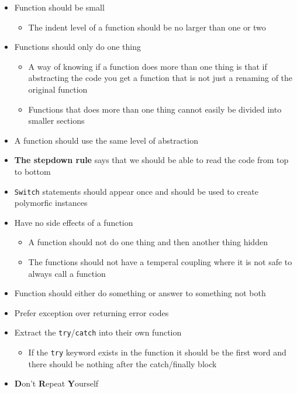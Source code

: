 \documentclass[11pt]{article}
\providecommand{\tightlist}{%
      \setlength{\itemsep}{0pt}\setlength{\parskip}{0pt}}
\begin{document}
\begin{itemize}
\tightlist
\item
  Function should be small

  \begin{itemize}
  \tightlist
  \item
    The indent level of a function should be no larger than one or two
  \end{itemize}
\item
  Functions should only do one thing

  \begin{itemize}
  \tightlist
  \item
    A way of knowing if a function does more than one thing is that if
    abstracting the code you get a function that is not just a renaming
    of the original function
  \item
    Functions that does more than one thing cannot easily be divided
    into smaller sections
  \end{itemize}
\item
  A function should use the same level of abstraction
\item
  \textbf{The stepdown rule} says that we should be able to read the
  code from top to bottom
\item
  \texttt{Switch} statements should appear once and should be used to
  create polymorfic instances
\item
  Have no side effects of a function

  \begin{itemize}
  \tightlist
  \item
    A function should not do one thing and then another thing hidden
  \item
    The functions should not have a temperal coupling where it is not
    safe to always call a function
  \end{itemize}
\item
  Function should either do something or answer to something not both
\item
  Prefer exception over returning error codes
\item
  Extract the \texttt{try}/\texttt{catch} into their own function

  \begin{itemize}
  \tightlist
  \item
    If the \texttt{try} keyword exists in the function it should be the
    first word and there should be nothing after the catch/finally
    block\\
  \end{itemize}
\item
  \textbf{D}on't \textbf{R}epeat \textbf{Y}ourself
\end{itemize}
\end{document}
